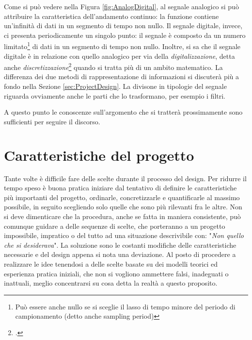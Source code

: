 \documentclass[a4paper, 10pt, final]{article} %
\begin{document}
    Come si pu\`{o} vedere nella Figura \ref{fig:AnalogDigital}, al segnale analogico si pu\`{o} attribuire la caratteristica dell'andamento continuo: la funzione contiene un'infinit\`{a} di dati in un segmento di tempo non nullo.
    Il segnale digitale, invece, ci presenta periodicamente un singolo punto: il segnale \`{e} composto da un numero limitato\footnote{Pu\`{o} essere anche nullo se si sceglie il lasso di tempo minore del periodo di campionamento (detto anche sampling period)} di dati in un segmento di tempo non nullo.
    Inoltre, si sa che il segnale digitale \`{e} in relazione con quello analogico per via della \emph{digitalizzazione}, detta anche \emph{discretizzazione}\footcite["Processo di trasferimento di funzioni continue, modelli, variabili ed equazioni in controparti discrete"]{Discretization:Wiki} quando si tratta pi\`{u} di un ambito matematico.
    La differenza dei due metodi di rappresentazione di informazioni si discuter\`{a} pi\`{u} a fondo nella Sezione \ref{sec:ProjectDesign}.
    La divisone in tipologie del segnale riguarda ovviamente anche le parti che lo trasformano, per esempio i filtri.

    A questo punto le conoscenze sull'argomento che si tratter\`{a} prossimamente sono sufficienti per seguire il discorso.

    \section{Caratteristiche del progetto}\label{sec:ProjectCharacteristics}
    Tante volte \`{e} difficile fare delle scelte durante il processo del design.
    Per ridurre il tempo speso \`{e} buona pratica iniziare dal tentativo di definire le caratteristiche pi\`{u} importanti del progetto, ordinarle, concretizzarle e quantificarle al massimo possibile, in seguito scegliendo solo quelle che sono pi\`{u} rilevanti fra le altre.
    Non si deve dimenticare che la procedura, anche se fatta in maniera consistente, pu\`{o} comunque guidare a delle sequenze di scelte, che porteranno a un progetto impossibile, impratico o del tutto ad una situazione descrivibile con: "\emph{Non quello che si desiderava}".
    La soluzione sono le costanti modifiche delle caratteristiche necessarie e del design appena si nota una deviazione.
    Al posto di procedere a realizzare le idee tenendosi a delle scelte basate su dei modelli teorici ed esperienza pratica iniziali, che non si vogliono ammettere falsi, inadeguati o inattuali, meglio concentrarsi su cosa detta la realt\`{a} a questo proposito.
\end{document}
